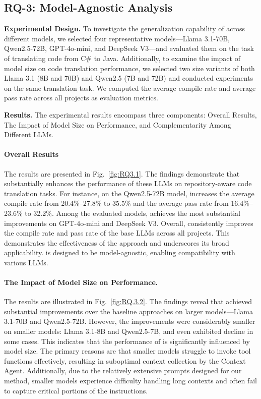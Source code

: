 \subsection{RQ-3: Model-Agnostic Analysis}
\label{sec:rq3}





\noindent\textbf{Experimental Design.} To investigate the generalization capability of \toolname across different models, we selected four representative models—Llama 3.1-70B, Qwen2.5-72B, GPT-4o-mini, and DeepSeek V3—and evaluated them on the task of translating code from C\# to Java. Additionally, to examine the impact of model size on code translation performance, we selected two size variants of both Llama 3.1 (8B and 70B) and Qwen2.5 (7B and 72B) and conducted experiments on the same translation task. We computed the average compile rate and average pass rate across all projects as evaluation metrics.

\noindent\textbf{Results.} The experimental results encompass three components: Overall Results, The Impact of Model Size on Performance, and Complementarity Among Different LLMs.

\paragraph{Overall Results} The results are presented in Fig.~\ref{fig:RQ3.1}. The findings demonstrate that \toolname substantially enhances the performance of these LLMs on repository-aware code translation tasks. For instance, on the Qwen2.5-72B model, \toolname increases the average compile rate from 20.4\%–27.8\% to 35.5\% and the average pass rate from 16.4\%–23.6\% to 32.2\%. Among the evaluated models, \toolname achieves the most substantial improvements on GPT-4o-mini and DeepSeek V3. Overall, \toolname consistently improves the compile rate and pass rate of the base LLMs across all projects. This demonstrates the effectiveness of the \toolname approach and underscores its broad applicability. \toolname is designed to be model-agnostic, enabling compatibility with various LLMs.


\paragraph{The Impact of Model Size on Performance.} The results are illustrated in Fig.~\ref{fig:RQ.3.2}. The findings reveal that \toolname achieved substantial improvements over the baseline approaches on larger models—Llama 3.1-70B and Qwen2.5-72B. However, the improvements were considerably smaller on smaller models: Llama 3.1-8B and Qwen2.5-7B, and even exhibited decline in some cases. This indicates that the performance of \toolname is significantly influenced by model size. The primary reasons are that smaller models struggle to invoke tool functions effectively, resulting in suboptimal context collection by the Context Agent. Additionally, due to the relatively extensive prompts designed for our method, smaller models experience difficulty handling long contexts and often fail to capture critical portions of the instructions.

